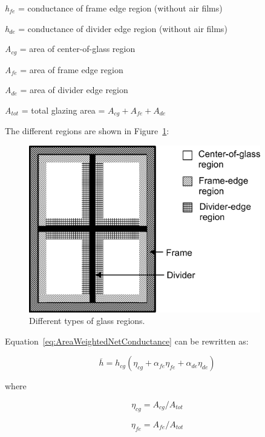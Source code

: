 \emph{h\(_{fe}\)} = conductance of frame edge region (without air films)

\emph{h\(_{de}\)} = conductance of divider edge region (without air films)

\emph{A\(_{cg}\)} = area of center-of-glass region

\emph{A\(_{fe}\)} = area of frame edge region

\emph{A\(_{de}\)} = area of divider edge region

\emph{A\(_{tot}\)} = total glazing area = \({A_{cg}} + {A_{fe}} + {A_{de}}\)

The different regions are shown in Figure~\ref{fig:different-types-of-glass-regions.}:

\begin{figure}[hbtp] %
\centering
\includegraphics[width=0.9\textwidth, height=0.9\textheight, keepaspectratio=true]{media/image1534.png}
\caption{Different types of glass regions. \label{fig:different-types-of-glass-regions.}}
\end{figure}

Equation~\ref{eq:AreaWeightedNetConductance} can be rewritten as:

\begin{equation}
\overline h  = {h_{cg}}\left( {{\eta_{cg}} + {\alpha_{fe}}{\eta_{fe}} + {\alpha_{de}}{\eta_{de}}} \right)
\label{eq:HbarConductanceEquation}
\end{equation}

where

\begin{equation}
{\eta_{cg}} = {A_{cg}}/{A_{tot}}
\end{equation}

\begin{equation}
{\eta_{fe}} = {A_{fe}}/{A_{tot}}
\end{equation}

